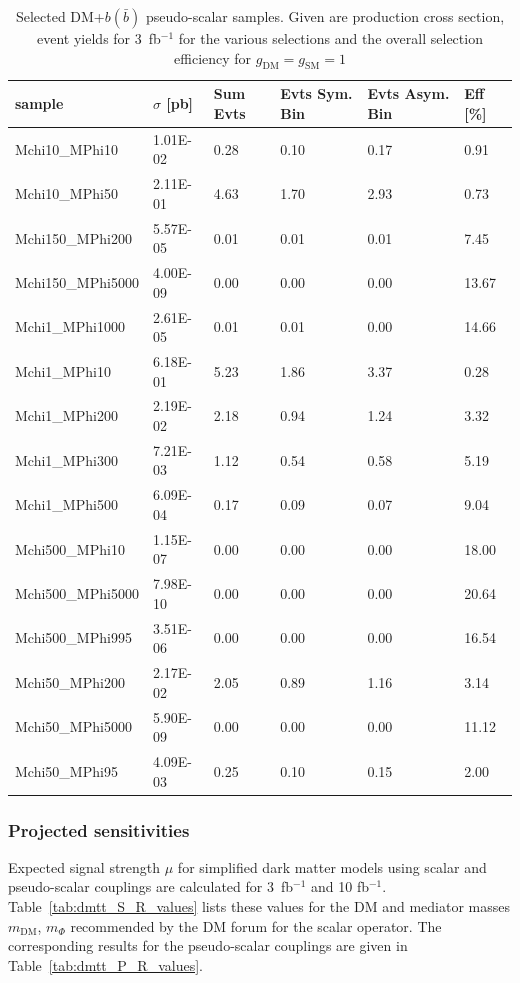 \begin{table}[h!]
\small
\centering
\begin{tabular}{l|lllll}
\hline
sample             & $\sigma$ [pb] & Sum Evts       & Evts Sym. Bin & Evts Asym. Bin & Eff  [\%]   \\\hline
Mchi10\_MPhi10    & 1.01E-02 & 0.28 & 0.10 & 0.17 & 0.91  \\
Mchi10\_MPhi50    & 2.11E-01 & 4.63 & 1.70 & 2.93 & 0.73  \\
Mchi150\_MPhi200  & 5.57E-05 & 0.01 & 0.01 & 0.01 & 7.45  \\
Mchi150\_MPhi5000 & 4.00E-09 & 0.00 & 0.00 & 0.00 & 13.67 \\
Mchi1\_MPhi1000   & 2.61E-05 & 0.01 & 0.01 & 0.00 & 14.66 \\
Mchi1\_MPhi10     & 6.18E-01 & 5.23 & 1.86 & 3.37 & 0.28  \\
Mchi1\_MPhi200    & 2.19E-02 & 2.18 & 0.94 & 1.24 & 3.32  \\
Mchi1\_MPhi300    & 7.21E-03 & 1.12 & 0.54 & 0.58 & 5.19  \\
Mchi1\_MPhi500    & 6.09E-04 & 0.17 & 0.09 & 0.07 & 9.04  \\
Mchi500\_MPhi10   & 1.15E-07 & 0.00 & 0.00 & 0.00 & 18.00 \\
Mchi500\_MPhi5000 & 7.98E-10 & 0.00 & 0.00 & 0.00 & 20.64 \\
Mchi500\_MPhi995  & 3.51E-06 & 0.00 & 0.00 & 0.00 & 16.54 \\
Mchi50\_MPhi200   & 2.17E-02 & 2.05 & 0.89 & 1.16 & 3.14  \\
Mchi50\_MPhi5000  & 5.90E-09 & 0.00 & 0.00 & 0.00 & 11.12 \\
Mchi50\_MPhi95    & 4.09E-03 & 0.25 & 0.10 & 0.15 & 2.00 \\
\hline
\end{tabular}
\caption{Selected DM+$b(\bar{b})$ pseudo-scalar samples. Given are production cross section, event yields for 3~fb$^{-1 }$ for the various selections and the overall selection efficiency for $g_\textrm{DM}=g_\textrm{SM}=1$ \label{tab:dmbb_P}}
\end{table}


\clearpage
\subsubsection{Projected sensitivities}

Expected signal strength $\mu$ for simplified dark matter models using scalar and pseudo-scalar couplings are calculated for 3~fb$^{-1 }$ and 10 fb$^{-1 }$. Table~\ref{tab:dmtt_S_R_values} lists these
values for the DM and mediator masses $m_\textrm{DM}$, $m_\Phi$ recommended by the DM forum for the scalar operator. The corresponding results for the pseudo-scalar couplings are given in Table~\ref{tab:dmtt_P_R_values}. 

